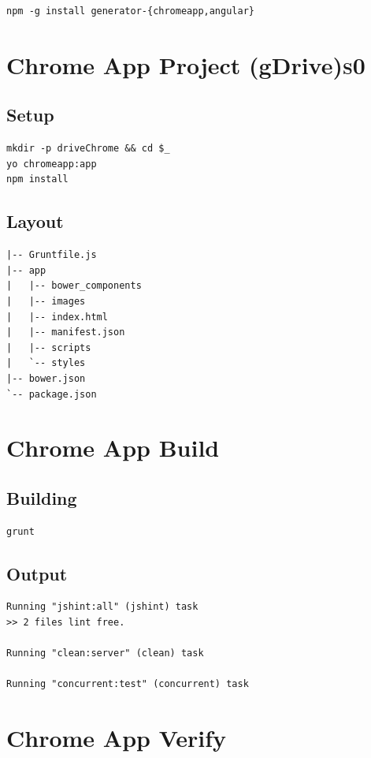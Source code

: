 \documentclass[11pt]{article}
\begin{document}
\begin{verbatim}
npm -g install generator-{chromeapp,angular}
\end{verbatim}
\section*{Chrome App Project (gDrive)\hfill{}\textsc{s0}}
\label{sec-4}


\subsection*{Setup}
\label{sec-4-1}

\begin{verbatim}
mkdir -p driveChrome && cd $_
yo chromeapp:app
npm install
\end{verbatim}
\subsection*{Layout}
\label{sec-4-2}

\begin{verbatim}
|-- Gruntfile.js
|-- app
|   |-- bower_components
|   |-- images
|   |-- index.html
|   |-- manifest.json
|   |-- scripts
|   `-- styles
|-- bower.json
`-- package.json
\end{verbatim}
\section*{Chrome App Build}
\label{sec-5}

\subsection*{Building}
\label{sec-5-1}

\begin{verbatim}
grunt
\end{verbatim}

\subsection*{Output}
\label{sec-5-2}

\begin{verbatim}
Running "jshint:all" (jshint) task
>> 2 files lint free.

Running "clean:server" (clean) task

Running "concurrent:test" (concurrent) task
\end{verbatim}
\section*{Chrome App Verify}
\label{sec-6}
\end{document}
